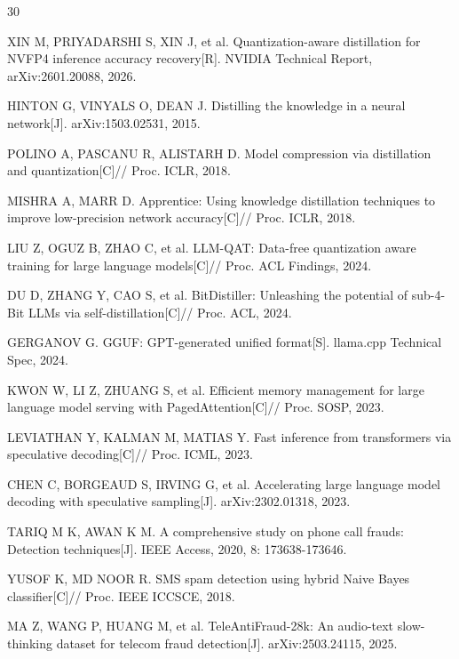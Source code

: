 \documentclass[UTF8,a4paper,10pt,twocolumn]{ctexart}
\theoremstyle{plain}
\begin{document}
\begin{thebibliography}{30}

XIN M, PRIYADARSHI S, XIN J, et al.
Quantization-aware distillation for NVFP4 inference accuracy recovery[R].
NVIDIA Technical Report, arXiv:2601.20088, 2026.

HINTON G, VINYALS O, DEAN J.
Distilling the knowledge in a neural network[J].
arXiv:1503.02531, 2015.

POLINO A, PASCANU R, ALISTARH D.
Model compression via distillation and quantization[C]//
Proc. ICLR, 2018.

MISHRA A, MARR D.
Apprentice: Using knowledge distillation techniques to improve low-precision network accuracy[C]//
Proc. ICLR, 2018.

LIU Z, OGUZ B, ZHAO C, et al.
LLM-QAT: Data-free quantization aware training for large language models[C]//
Proc. ACL Findings, 2024.

DU D, ZHANG Y, CAO S, et al.
BitDistiller: Unleashing the potential of sub-4-Bit LLMs via self-distillation[C]//
Proc. ACL, 2024.

GERGANOV G.
GGUF: GPT-generated unified format[S].
llama.cpp Technical Spec, 2024.

KWON W, LI Z, ZHUANG S, et al.
Efficient memory management for large language model serving with PagedAttention[C]//
Proc. SOSP, 2023.

LEVIATHAN Y, KALMAN M, MATIAS Y.
Fast inference from transformers via speculative decoding[C]//
Proc. ICML, 2023.

CHEN C, BORGEAUD S, IRVING G, et al.
Accelerating large language model decoding with speculative sampling[J].
arXiv:2302.01318, 2023.

TARIQ M K, AWAN K M.
A comprehensive study on phone call frauds: Detection techniques[J].
IEEE Access, 2020, 8: 173638-173646.

YUSOF K, MD NOOR R.
SMS spam detection using hybrid Naive Bayes classifier[C]//
Proc. IEEE ICCSCE, 2018.

MA Z, WANG P, HUANG M, et al.
TeleAntiFraud-28k: An audio-text slow-thinking dataset for telecom fraud detection[J].
arXiv:2503.24115, 2025.


\end{thebibliography}
\end{document}
